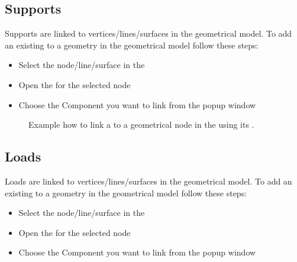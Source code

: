 \documentclass[letterpaper,10pt,english]{jupyterBook}
\let\sphinxpxdimen\pdfpxdimen\else\newdimen\sphinxpxdimen
\begin{document}
\subsection{Supports}
\label{\detokenize{Setting_up_a_problem:supports}}
\sphinxAtStartPar
Supports are linked to vertices/lines/surfaces in the geometrical model. To add an existing  to a
geometry in the geometrical model follow these steps:
\begin{itemize}
\item {} 
\sphinxAtStartPar
Select the node/line/surface in the 

\item {} 
\sphinxAtStartPar
Open the  for the selected node

\item {} 
\sphinxAtStartPar
Choose the Component you want to link from the pop\sphinxhyphen{}up window

\end{itemize}

\begin{figure}[htbp]
\centering
\capstart

\noindent\sphinxincludegraphics[height=500\sphinxpxdimen]{{add_support}.png}
\caption{Example how to link a  to a geometrical node in the  using its .}\label{\detokenize{Setting_up_a_problem:add-support}}\end{figure}


\subsection{Loads}
\label{\detokenize{Setting_up_a_problem:loads}}
\sphinxAtStartPar
Loads are linked to vertices/lines/surfaces in the geometrical model. To add an existing  to a geometry
in the geometrical model follow these steps:
\begin{itemize}
\item {} 
\sphinxAtStartPar
Select the node/line/surface in the 

\item {} 
\sphinxAtStartPar
Open the  for the selected node

\item {} 
\sphinxAtStartPar
Choose the Component you want to link from the pop\sphinxhyphen{}up window

\end{itemize}
\end{document}
